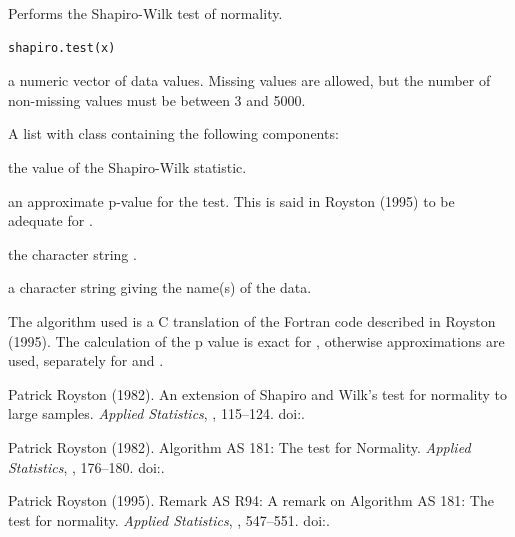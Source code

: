 \documentclass[
  letterpaper,
  DIV=11,
  numbers=noendperiod]{scrartcl}
\begin{document}
%
\begin{Description}\relax
Performs the Shapiro-Wilk test of normality.
\end{Description}
%
\begin{Usage}
\begin{verbatim}
shapiro.test(x)
\end{verbatim}
\end{Usage}
%
\begin{Arguments}
\begin{ldescription}
\item[\code{x}] a numeric vector of data values. Missing values are allowed,
but the number of non-missing values must be between 3 and 5000.
\end{ldescription}
\end{Arguments}
%
\begin{Value}
A list with class  containing the following components:
\begin{ldescription}
\item[\code{statistic}] the value of the Shapiro-Wilk statistic.
\item[\code{p.value}] an approximate p-value for the test.  This is
said in Royston (1995) to be adequate for .
\item[\code{method}] the character string .
\item[\code{data.name}] a character string giving the name(s) of the data.
\end{ldescription}
\end{Value}
%
\begin{Source}\relax
The algorithm used is a C translation of the Fortran code described in
Royston (1995). 
The calculation of the p value is exact for , otherwise
approximations are used, separately for  and
.
\end{Source}
%
\begin{References}\relax
Patrick Royston (1982).
An extension of Shapiro and Wilk's  test for normality to large
samples.
\emph{Applied Statistics}, , 115--124.
doi:\nobreakspace{}.

Patrick Royston (1982).
Algorithm AS 181: The  test for Normality.
\emph{Applied Statistics}, , 176--180.
doi:\nobreakspace{}.

Patrick Royston (1995).
Remark AS R94: A remark on Algorithm AS 181: The  test for
normality.
\emph{Applied Statistics}, , 547--551.
doi:\nobreakspace{}.
\end{References}
\end{document}
